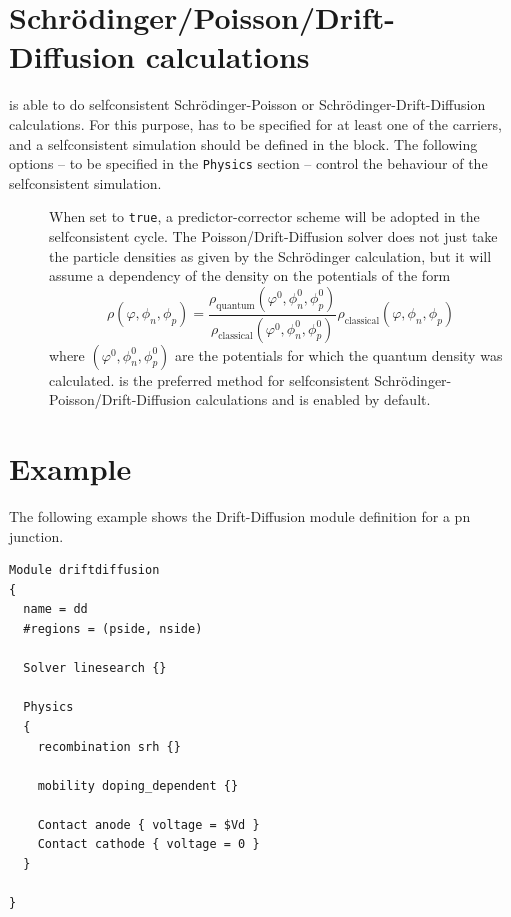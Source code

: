 \section{Schr\"odinger/Poisson/Drift-Diffusion calculations}
\label{DD:schrpoiss}
\TiberCAD{} is able to do selfconsistent Schr\"odinger-Poisson or Schr\"odinger-Drift-Diffusion calculations.
For this purpose,  has to be specified for at least one of the carriers, and a selfconsistent simulation should be defined in the \Selfconsistent{} block.
The following options -- to be specified in the \texttt{Physics} section -- control the behaviour of the selfconsistent simulation.
\begin{description}
\item[ ] When set to \texttt{true}, a predictor-corrector scheme will be adopted in the selfconsistent cycle.
The Poisson/Drift-Diffusion solver does not just take the particle densities as given by the Schr\"odinger calculation, but it will assume a dependency of the density on the potentials of the form
\begin{equation}
\rho(\varphi, \phi_n, \phi_p) = \frac{\rho_{\mathrm{quantum}}(\varphi^0, \phi_n^0, \phi_p^0)}{\rho_{\mathrm{classical}}(\varphi^0, \phi_n^0, \phi_p^0)}\rho_{\mathrm{classical}}(\varphi, \phi_n, \phi_p)
\end{equation}
where $(\varphi^0, \phi_n^0, \phi_p^0)$ are the potentials for which the quantum density was calculated.
 is the preferred method for selfconsistent Schr\"odinger-Poisson/Drift-Diffusion calculations and is enabled by default. 
\end{description}



\section{Example}

The following example shows the Drift-Diffusion module definition for a pn junction.
\begin{inputfile}
\begin{verbatim}
Module driftdiffusion
{
  name = dd
  #regions = (pside, nside)

  Solver linesearch {}

  Physics
  {
    recombination srh {}

    mobility doping_dependent {}

    Contact anode { voltage = $Vd }
    Contact cathode { voltage = 0 }
  }
   
}
\end{verbatim}
\caption{\Models{} section for drift-diffusion}
\label{dd:models}
\end{inputfile}


